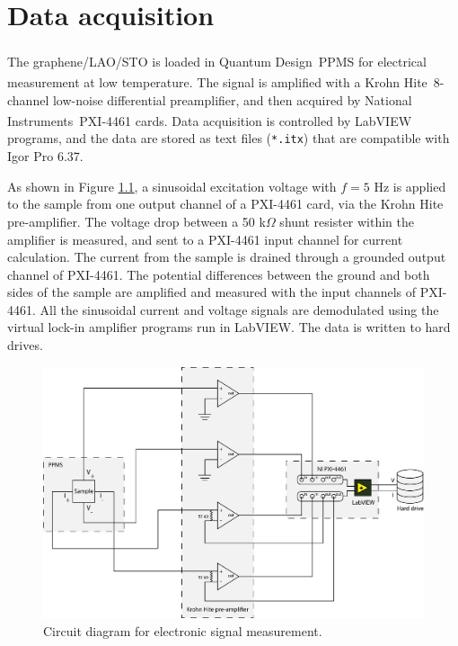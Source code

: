 \documentclass[pdflatex, sectionletters, 12pt, final, phd]{pittetd}    %
\begin{document}
\chapter{Data acquisition}

The graphene/LAO/STO is loaded in Quantum Design\textsuperscript\textregistered \ PPMS for electrical measurement at low temperature. The signal is amplified with a Krohn Hite\textsuperscript\textregistered \ 8-channel low-noise differential preamplifier, and then acquired by National Instruments\textsuperscript\textregistered \ PXI-4461 cards. Data acquisition is controlled by LabVIEW programs, and the data are stored as text files (\verb|*.itx|) that are compatible with Igor Pro 6.37.

As shown in Figure \ref{FIG:Circuit}, a sinusoidal excitation voltage with $f = 5$ Hz is applied to the sample from one output channel of a PXI-4461 card, via the Krohn Hite pre-amplifier. The voltage drop between a 50 k$\Omega$ shunt resister within the amplifier is measured, and sent to a PXI-4461 input channel for current calculation. The current from the sample is drained through a grounded output channel of PXI-4461. The potential differences between the ground and both sides of the sample are amplified and measured with the input channels of PXI-4461. All the sinusoidal current and voltage signals are demodulated using the virtual lock-in amplifier programs run in LabVIEW. The data is written to hard drives.

\begin{figure}[h!]
	\centering	
	\includegraphics[width=.9\textwidth]{Drawing/Circuit.pdf}
	\caption[Circuit diagram for electronic signal measurement]{Circuit diagram for electronic signal measurement.}
	\label{FIG:Circuit}
\end{figure}


% 

\end{document}
